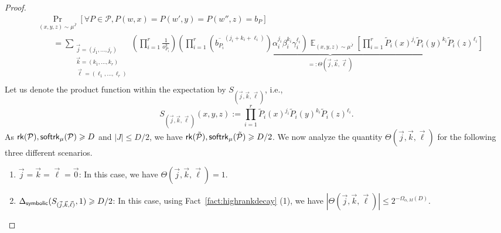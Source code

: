 \documentclass[11pt]{article}
\newcommand\card[1]{\left| {#1} \right|}
\newcommand\Prob[2]{{\Pr_{#1}\left[ {#2} \right]}}
\newcommand\Expect[2]{{\mathop{\mathbb{E}}_{#1}\left[ {#2} \right]}}
\renewcommand\geq{\geqslant}
\renewcommand\leq{\leqslant}
\begin{document}
\begin{proof}
         \begin{align*}
          &\Prob{(x,y,z)\sim\mu^{\bar{J}}}{\forall P\in \mathcal{P}, P(w,x)=P(w',y)=P(w'',z) = b_P} \\
          &\quad\quad= \sum_{\substack{\vec{j} = (j_1, \ldots, j_r) \\ \vec{k} = (k_1, \ldots, k_r) \\ \vec{\ell} = (\ell_1, \ldots, \ell_r)}}  \left(\prod_{i=1}^r \frac{1}{o_{P_i}^3}\right)\underbrace{\left(\prod_{i=1}^r \left(\overline{b_{P_i}}^{(j_i +k_i+\ell_i)}\right) \alpha_i^{j_i} \beta_i^{k_i} \gamma_i^{\ell_i}\right) \Expect{(x,y,z)\sim\mu^{\bar{J}}}{\prod_{i=1}^r \tilde{P}_i(x)^{j_i} \tilde{P}_i(y)^{k_i} \tilde{P}_i(z)^{\ell_i}}}_{=:\Theta(\vec{j}, \vec{k}, \vec{\ell})}\\
      \end{align*}
     Let us denote the product function within the expectation by $S_{(\vec{j}, \vec{k}, \vec{\ell})}$, i.e., 
     $$ S_{(\vec{j}, \vec{k}, \vec{\ell})}(x, y, z):= \prod_{i=1}^r \tilde{P}_i(x)^{j_i} \tilde{P}_i(y)^{k_i} \tilde{P}_i(z)^{\ell_i}.$$
     As  ${\sf rk}(\mathcal{P}),{\sf softrk}_{\mu}(\mathcal{P})\geq D$ and $|J|\leq D/2$, we have ${\sf rk}(\tilde{\mathcal{P}}),{\sf softrk}_{\mu}(\tilde{\mathcal{P}})\geq D/2$. We now analyze the quantity $\Theta(\vec{j}, \vec{k}, \vec{\ell})$ for the following three different scenarios. 
     \begin{enumerate}
         \item[(a)] $\vec{j} = \vec{k} = \vec{\ell} = \vec{0}$: In this case, we have $\Theta(\vec{j}, \vec{k}, \vec{\ell})= 1$.
         
         \item[(b)] $\Delta_{{\sf symbolic}}(S_{(\vec{j}, \vec{k}, \vec{\ell})},1)\geq D/2$: In this case, using Fact~\ref{fact:highrankdecay} (1), we have $\card{\Theta(\vec{j}, \vec{k}, \vec{\ell})} \leq 2^{-\Omega_{\alpha, M}(D)}$.
         

\end{enumerate}
\end{proof}
\end{document}
